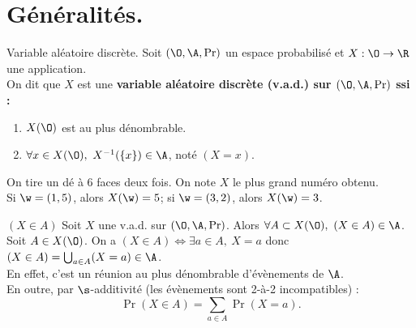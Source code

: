 \documentclass[11pt]{article}
\begin{document}


\vspace*{-0.7cm}

\section{Généralités.}

\begin{defi}{Variable aléatoire discrète.}{}
    Soit $(\O,\A,\Pr)$ un espace probabilisé et $X:\O\to\R$ une application.\\
    On dit que $X$ est une \bf{variable aléatoire discrète} (v.a.d.) sur $(\O,\A,\Pr)$ ssi :
    \begin{enumerate}
        \item $X(\O)$ est au plus dénombrable.
        \item $\forall x \in X(\O), ~ X^{-1}(\{x\})\in\A$, noté $(X = x)$.
    \end{enumerate}
\end{defi}

\vspace*{-0.8cm}

\begin{ex}{}{}
    On tire un dé à 6 faces deux fois. On note $X$ le plus grand numéro obtenu.\\
    Si $\w=(1, 5)$, alors $X(\w)=5$; si $\w=(3,2)$, alors $X(\w)=3$.
\end{ex}

\vspace*{-0.8cm}

\begin{prop}{$(X\in A)$}{}
    Soit $X$ une v.a.d. sur $(\O,\A,\Pr)$. Alors $\forall A \subset X(\O), ~ (X \in A)\in\A$.
    \tcblower
    Soit $A\in X(\O)$. On a $(X\in A) \iff \exists a \in A, ~ X=a$ donc $(X\in A) = \bigcup_{a\in A}(X=a)\in \A$.\\
    En effet, c'est un réunion au plus dénombrable d'évènements de $\A$.\\
    En outre, par $\s$-additivité (les évènements sont 2-à-2 incompatibles) :
    \begin{equation*}
        \Pr(X\in A) = \sum_{a\in A}\Pr(X=a).
    \end{equation*}
\end{prop}

\vspace*{-0.8cm}
\end{document}
